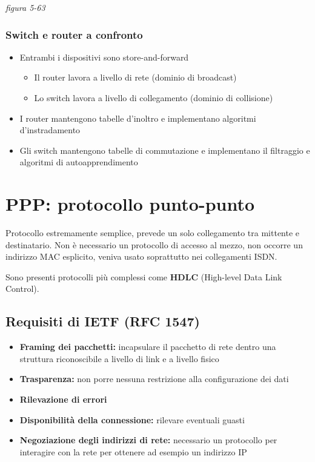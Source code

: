 \documentclass[
]{article}
\begin{document}
\emph{figura 5-63}

\hypertarget{header-n228}{%
\subsubsection{Switch e router a confronto}\label{header-n228}}

\begin{itemize}
\item
  Entrambi i dispositivi sono store-and-forward

  \begin{itemize}
  \item
    Il router lavora a livello di rete (dominio di broadcast)
  \item
    Lo switch lavora a livello di collegamento (dominio di collisione)
  \end{itemize}
\item
  I router mantengono tabelle d'inoltro e implementano algoritmi
  d'instradamento
\item
  Gli switch mantengono tabelle di commutazione e implementano il
  filtraggio e algoritmi di autoapprendimento
\end{itemize}

\hypertarget{header-n241}{%
\section{PPP: protocollo punto-punto}\label{header-n241}}

Protocollo estremamente semplice, prevede un solo collegamento tra
mittente e destinatario. Non è necessario un protocollo di accesso al
mezzo, non occorre un indirizzo MAC esplicito, veniva usato soprattutto
nei collegamenti ISDN.

Sono presenti protocolli più complessi come \textbf{HDLC} (High-level
Data Link Control).

\hypertarget{header-n244}{%
\subsection{Requisiti di IETF (RFC 1547)}\label{header-n244}}

\begin{itemize}
\item
  \textbf{Framing dei pacchetti:} incapsulare il pacchetto di rete
  dentro una struttura riconoscibile a livello di link e a livello
  fisico
\item
  \textbf{Trasparenza: }non porre nessuna restrizione alla
  configurazione dei dati
\item
  \textbf{Rilevazione di errori}
\item
  \textbf{Disponibilità della connessione: }rilevare eventuali guasti
\item
  \textbf{Negoziazione degli indirizzi di rete: }necessario un
  protocollo per interagire con la rete per ottenere ad esempio un
  indirizzo IP
\end{itemize}
\end{document}
